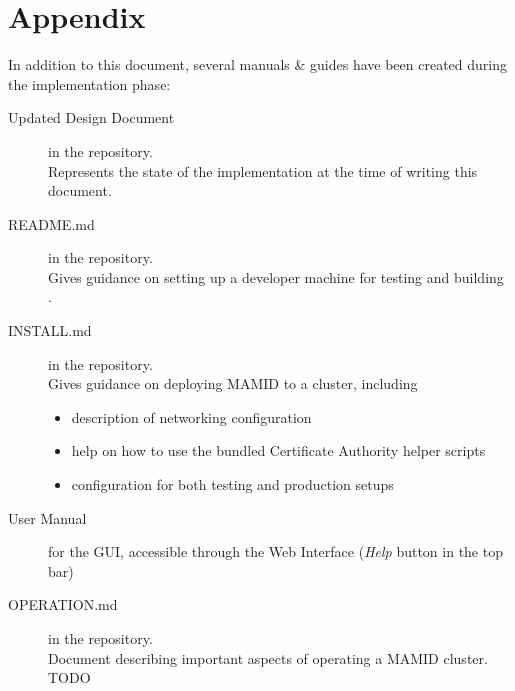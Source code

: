 \section{Appendix}

In addition to this document, several manuals \& guides have been created during the implementation phase:

\begin{description}
\item[Updated Design Document] in the  repository.\\
      Represents the state of the implementation at the time of writing this document.
\item[README.md] in the  repository.\\
      Gives guidance on setting up a developer machine for testing and building \mamid.
\item[INSTALL.md] in the  repository.\\
      Gives guidance on deploying MAMID to a cluster, including 
      \begin{itemize}
        \item description of networking configuration
        \item help on how to use the bundled Certificate Authority helper scripts
        \item configuration for both testing and production setups
      \end{itemize}
\item[User Manual] for the GUI, accessible through the \mamid Web Interface (\textit{Help} button in the top bar)
\item[OPERATION.md] in the  repository.\\
      Document describing important aspects of operating a MAMID cluster. TODO
\end{description}
